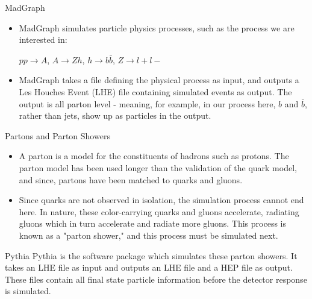 \documentclass{beamer}
\begin{document}
	\begin{frame}{MadGraph}
		\begin{itemize}
\item<1->MadGraph simulates particle physics processes, such as the process we are interested in:

\bigskip

$p p \rightarrow{} A$, $A \rightarrow{} Z h$, $h \rightarrow{} b \bar{b}$, $Z \rightarrow{} l+ l-$

\bigskip

\item<1->MadGraph takes a file defining the physical process as input, and outputs a Les Houches Event (LHE) file containing simulated events as output. The output is all parton level - meaning, for example, in our process here, $b$ and $\bar{b}$, rather than jets, show up as particles in the output.
		\end{itemize}
	\end{frame}
	\begin{frame}{Partons and Parton Showers}
		\begin{itemize}
\item<1->A parton is a model for the constituents of hadrons such as protons. The parton model has been used longer than the validation of the quark model, and since, partons have been matched to quarks and gluons.

\bigskip

\item<1->Since quarks are not observed in isolation, the simulation process cannot end here. In nature, these color-carrying quarks and gluons accelerate, radiating gluons which in turn accelerate and radiate more gluons. This process is known as a "parton shower," and this process must be simulated next.
		\end{itemize}
	\end{frame}
	\begin{frame}{Pythia}
Pythia is the software package which simulates these parton showers. It takes an LHE file as input and outputs an LHE file and a HEP file as output. These files contain all final state particle information before the detector response is simulated.
	\end{frame}
\end{document}
